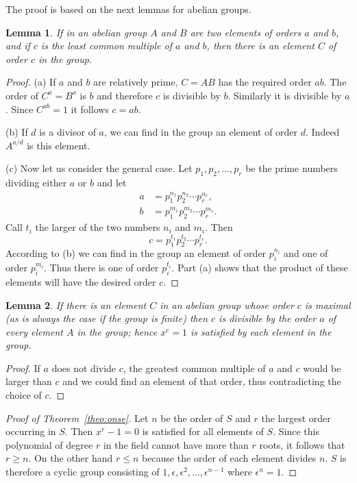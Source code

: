 \documentclass[10pt,leqno,a5paper]{book}
\newtheorem{lemm}{Lemma}
\theoremstyle{definition}
\begin{document}
The proof is based on the next lemmas for abelian groups.


\begin{lemm}
\label{lemm:on}
If in an abelian group $A$ and $B$ are two elements of orders $a$ and $b$, and if $c$ is the least common multiple of $a$ and $b$, then there is an element $C$ of order $c$ in the group.
\end{lemm}

\begin{proof}
(a) If $a$ and $b$ are relatively prime, $C = AB$ has the required order $ab$.
The order of $C^a = B^a$ is $b$ and therefore $c$ is divisible by $b$.
Similarly it is divisible by $a$.
Since $C^{ab} = 1$ it follows $c = ab$.

(b) If $d$ is a divisor of $a$, we can find in the group an element of order $d$.
Indeed $A^{a/d}$ is this element.

(c) Now let us consider the general case.
Let $p_1, p_2, \ldots, p_r$ be the prime numbers dividing either $a$ or $b$ and let
\begin{align*}
a &= p_1^{n_1} p_2^{n_2} \cdots p_r^{n_r},
\\
b &= p_1^{m_1} p_2^{m_2} \cdots p_r^{m_r}.
\end{align*}
Call $t_i$ the larger of the two numbers $n_i$ and $m_i$.
Then
\[
c = p_1^{t_1} p_2^{t_2} \cdots p_r^{t_r}.
\]
According to (b) we can find in the group an element of order $p_i^{n_i}$ and one of order $p_i^{m_i}$.
Thus there is one of order $p_i^{t_i}$.
Part (a) shows that the product of these elements will have the desired order $c$.
\end{proof}


\begin{lemm}
\label{lemm:tw}
If there is an element $C$ in an abelian group whose order $c$ is maximal (as is always the case if the group is finite) then $c$ is divisible by the order $a$ of every element $A$ in the group; hence $x^c = 1$ is satisfied by each element in the group.
\end{lemm}

\begin{proof}
If $a$ does not divide $c$, the greatest common multiple of $a$ and $c$ would be larger than $c$ and we could find an element of that order, thus contradicting the choice of $c$.
\end{proof}


\begin{proof}[Proof of Theorem~\ref{theo:onse}]
Let $n$ be the order of $S$ and $r$ the largest order occurring in $S$.
Then $x^r - 1 = 0$ is satisfied for all elements of $S$.
Since this polynomial of degree $r$ in the field cannot have more than $r$ roots, it follows that $r \geq n$.
On the other hand $r \leq n$ because the order of each element divides $n$.
$S$ is therefore a cyclic group consisting of $1, \epsilon, \epsilon^2, \ldots, \epsilon^{n-1}$ where $\epsilon^n = 1$.
\end{proof}
\end{document}
